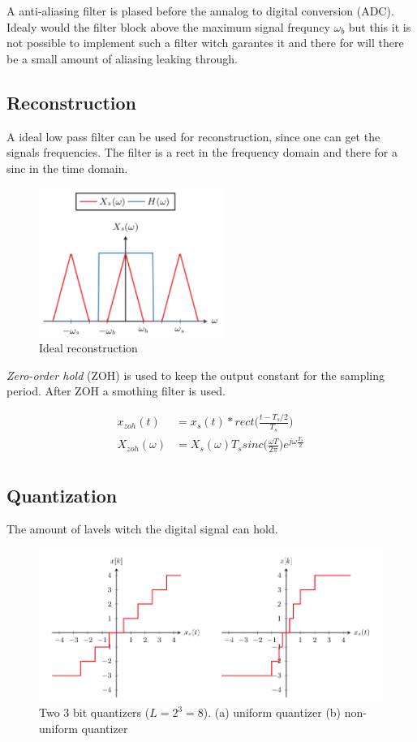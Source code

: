 \documentclass{article}
\begin{document}
A anti-aliasing filter is plased before the annalog to digital conversion (ADC).
Idealy would the filter block above the maximum signal frequncy $\omega_b$ but this 
it is not possible to implement such a filter witch garantes it and there for will 
there be a small amount of aliasing leaking through.


\subsection{Reconstruction}
A ideal low pass filter can be used for reconstruction, since one can get the signals frequencies.
The filter is a rect in the frequency domain and there for a sinc in the time domain.
\begin{figure}[!h]
    \centering
    \includegraphics[width=6cm]{image/ideal_reconstruction.pdf}
    \caption{Ideal reconstruction}
    \label{fig:ideal_reconstcion}
\end{figure}

\textit{Zero-order hold} (ZOH) is used to keep the output constant for the sampling period.
After ZOH a smothing filter is used.

\begin{align*}
    x_{zoh}(t) &= x_s(t)*rect\Big(\frac{t-T_s/2}{T_s}\Big) \\
    X_{zoh}(\omega) &= X_s(\omega)T_s sinc\Big(\frac{\omega T}{2\pi}\Big)e^{j\omega\frac{T_s}{2}} \\
\end{align*}

\subsection{Quantization}
The amount of lavels witch the digital signal can hold.

\newpage
\begin{figure}[!h]
    \centering
    \includegraphics[width=12cm]{image/quantization.png}
    \caption{Two 3 bit quantizers ($L=2^3=8$). (a) uniform quantizer (b) non-uniform quantizer}
    \label{fig:quantization}
\end{figure}
\end{document}
